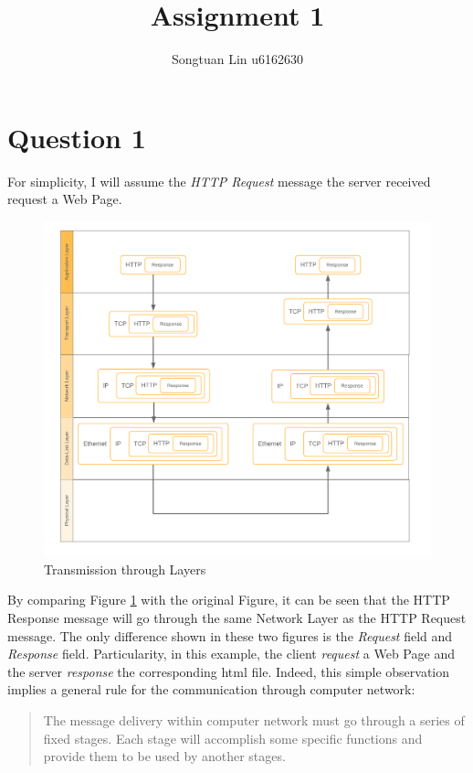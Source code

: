 \documentclass[10pt,a4paper]{article}
\author{Songtuan Lin u6162630}
\title{Assignment 1}
\begin{document}
\maketitle

\section*{Question 1}
For simplicity, I will assume the \textit{HTTP Request} message the server received request a Web Page. 
\begin{figure}[H]
	\center
	\includegraphics[scale=0.7]{Layers}
	\caption{Transmission through Layers}
	\label{fig_1}
\end{figure}
By comparing Figure \ref{fig_1} with the original Figure, it can be seen that the HTTP Response message will go through the same Network Layer as the HTTP Request message. The only difference shown in these two figures is the \textit{Request} field and \textit{Response} field. Particularity, in this example, the client \textit{request} a Web Page and the server \textit{response} the corresponding html file. Indeed, this simple observation implies a general rule for the communication through computer network:
\begin{quote}
	The message delivery within computer network must go through a series of fixed stages. Each stage will accomplish some specific functions and provide them to be used by another stages.
\end{quote}
\end{document}

